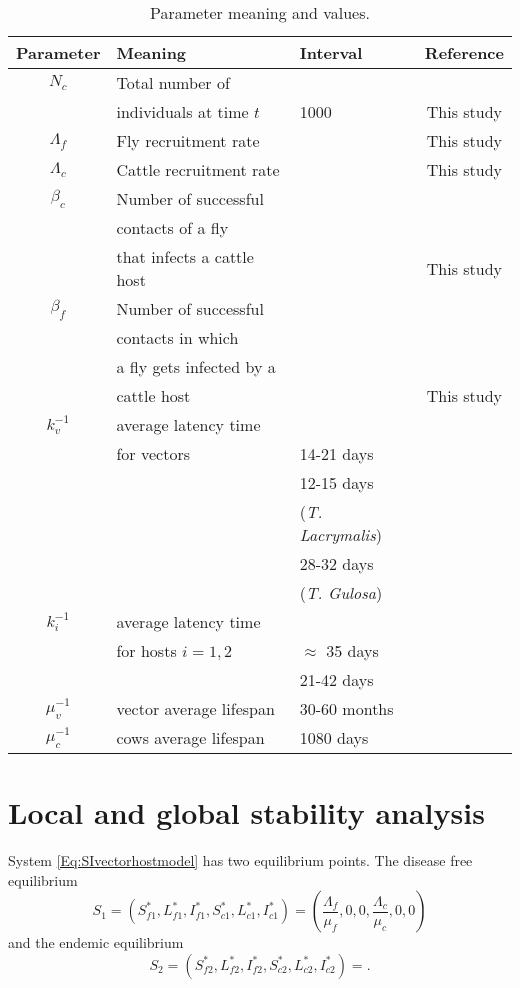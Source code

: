\documentclass[preprint,12pt]{elsarticle}
\begin{document}
\begin{table}[htb]
	\begin{center}
        \begin{tabular}{cllc}
			\hline
			Parameter		&	Meaning & Interval & Reference
			\\
			\midrule
			$N_c$& Total number of &&\\
			&individuals at time $t$ &1000&This study
			\\
			$\Lambda_f$& Fly recruitment rate & & This study
			\\
			$\Lambda_c$& Cattle recruitment rate & & This study
			\\			
			$\beta_c$& Number of successful &&\\
			&contacts of a fly &&
				\\
			& that infects a cattle host &&This study
				\\
			$\beta_f$& Number of successful&&\\
			&contacts in which &&
				\\
			& a fly gets infected by a &&\\
			&cattle host &&This study
				\\
			$k_v^{-1}$	& average latency time &&\\
			&for vectors & 14-21 days &\cite{Otranto:bookchapter}
			\\
				& & 12-15 days &\\
				&&(\textit{T. Lacrymalis}) &\cite{Chanie:2014}
			\\
				& & 28-32 days&\\ 
				&&(\textit{T. Gulosa}) &\cite{Chanie:2014}
			\\
			$k_{i}^{-1}$
			&
				average latency time &&\\
				&for hosts $i=1,2$ & $\approx$ 35 days& \cite{Otranto:bookchapter}
			\\
			& & 21-42 days& \cite{Chanie:2014}
			\\			
			 $\mu_v^{-1}$	& vector average lifespan & 30-60 months&\cite{sanchez:1998}
			\\
			$\mu_c^{-1}$
			&
				cows average lifespan & 1080 days& \cite{FAOweb}
			\\
    		\bottomrule
		\end{tabular}
	\end{center}
	\caption{
		Parameter meaning and values.}
    \label{Table:Parameters}
\end{table}


\section{Local and global stability analysis}
\noindent System \ref{Eq:SIvectorhostmodel} has two equilibrium points. 
The disease free equilibrium 
$$
    S_1 = (S_{f1}^*,L_{f1}^*,I_{f1}^*,S_{c1}^*,L_{c1}^*,I_{c1}^*) = 
    (\frac{\Lambda_f}{\mu_f},0,0,\frac{\Lambda_c}{\mu_c},0,0)
$$ 
and the endemic 
equilibrium 
$$
    S_2 = (S_{f2}^*,L_{f2}^*,I_{f2}^*,S_{c2}^*,L_{c2}^*,I_{c2}^*) = 
    .
$$
\end{document}
